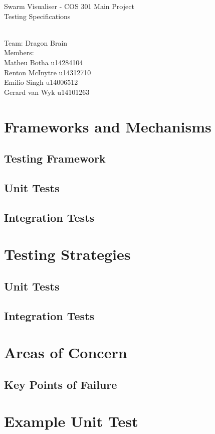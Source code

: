 \documentclass[11pt]{article}
\begin{document}
\begin{titlepage}

\begin{center}
\begin{huge}
Swarm Visualiser - COS 301 Main Project
\\
Testing Specifications
\begin{small}
\\
Team: Dragon Brain
\\
Members:
\\
Matheu Botha u14284104
\\
Renton McInytre u14312710
\\
Emilio Singh u14006512
\\
Gerard van Wyk u14101263

\end{small}

\end{huge}
\end{center}
\end{titlepage}

\pagebreak

\tableofcontents

\section{Frameworks and Mechanisms}
\subsection{Testing Framework}
\lipsum
\subsection{Unit Tests}
\lipsum
\subsection{Integration Tests}
\lipsum

\section{Testing Strategies}
\subsection{Unit Tests}
\lipsum
\subsection{Integration Tests}
\lipsum

\section{Areas of Concern}
\subsection{Key Points of Failure}
\lipsum

\section{Example Unit Test}
\end{document}
